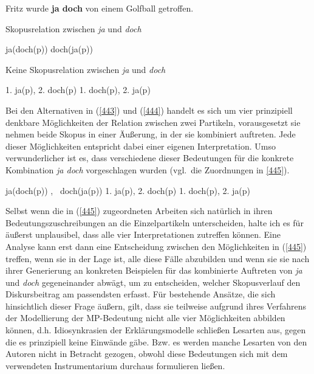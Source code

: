 \begin{exe}
	\ex\label{442} 
	Fritz wurde \textbf{ja doch} von einem Golfball getroffen.
\end{exe}
	
\begin{exe}
	\ex\label{443} Skopusrelation zwischen \textit{ja} und \textit{doch}
	\begin{xlist}
		\ex\label{443a} ja(doch(p))	
 		\ex\label{443b}	doch(ja(p))		
 	\end{xlist}	
\end{exe}

\begin{exe}
	\ex\label{444} Keine Skopusrelation zwischen \textit{ja} und \textit{doch}
	\begin{xlist}
		\ex\label{444a} 1. ja(p), 2. doch(p)	
 		\ex\label{444b}	1. doch(p), 2. ja(p)		
 	\end{xlist}	
\end{exe}
Bei den Alternativen in (\ref{443}) und (\ref{444}) handelt es sich um vier prinzipiell denkbare Möglichkeiten der Relation zwischen zwei Partikeln, vorausgesetzt sie nehmen beide Skopus in einer Äußerung, in der sie kombiniert auftreten. Jede dieser Möglichkeiten entspricht dabei einer eigenen Interpretation. Umso verwunderlicher ist es, dass verschiedene dieser Bedeutungen für die konkrete Kombination \textit{ja doch} vorgeschlagen wurden (vgl.\ die Zuordnungen in \ref{445}).\largerpage[-1]

\begin{exe}
	\ex\label{445} 
	\begin{xlist}
		\ex\label{445a} ja(doch(p))
		\hfill\hbox{\citet{Ormelius-Sandblom1997}, \citet{Rinas2007}}	
 		\ex\label{445b}	doch(ja(p))	
 		\hfill\hbox{\citet{Lindner1991}}	
 		\ex\label{445c} 1. ja(p), 2. doch(p)
 		\hfill\hbox{\citet{Thurmair1989}}		
 		\ex\label{445d}	1. doch(p), 2. ja(p) 	
 		\hfill\hbox{\citet{Doherty1985}}		
 	\end{xlist}	
\end{exe}									
Selbst wenn die in (\ref{445}) zugeordneten Arbeiten sich natürlich in ihren Bedeutungszuschreibungen an die Einzelpartikeln unterscheiden, halte ich es für äußerst unplausibel, dass alle vier Interpretationen zutreffen können. Eine Analyse kann erst dann eine Entscheidung zwischen den Möglichkeiten in (\ref{445}) treffen, wenn sie in der Lage ist, alle diese Fälle abzubilden und wenn sie sie nach ihrer Gene\-rierung an konkreten Beispielen für das kombinierte Auftreten von \textit{ja} und \textit{doch} gegeneinander abwägt, um zu entscheiden, welcher Skopusverlauf den Diskursbeitrag am passendsten erfasst. Für bestehende Ansätze, die sich hinsichtlich dieser Frage äußern, gilt, dass sie teilweise aufgrund ihres Verfahrens der Model\-lierung der MP-Bedeutung nicht alle vier Möglichkeiten abbilden können, d.h. I\-diosynkrasien der Erklärungsmodelle schließen Lesarten aus, gegen die es prinzi\-piell keine Einwände gäbe. Bzw. es werden manche Lesarten von den Autoren nicht in Betracht gezogen, obwohl diese Bedeutungen sich mit dem verwendeten Instrumentarium durchaus formulieren ließen. 

